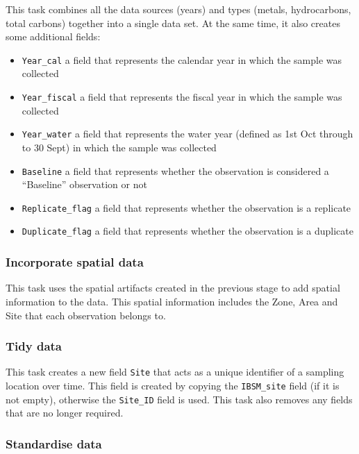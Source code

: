 \documentclass[
  8pt,
  a4paper]{article}
\providecommand{\tightlist}{%
  \setlength{\itemsep}{0pt}\setlength{\parskip}{0pt}}\usepackage{longtable,booktabs,array}
\begin{document}
This task combines all the data sources (years) and types (metals,
hydrocarbons, total carbons) together into a single data set. At the
same time, it also creates some additional fields:

\begin{itemize}
\tightlist
\item
  \texttt{Year\_cal} a field that represents the calendar year in which
  the sample was collected
\item
  \texttt{Year\_fiscal} a field that represents the fiscal year in which
  the sample was collected
\item
  \texttt{Year\_water} a field that represents the water year (defined
  as 1st Oct through to 30 Sept) in which the sample was collected
\item
  \texttt{Baseline} a field that represents whether the observation is
  considered a ``Baseline'' observation or not
\item
  \texttt{Replicate\_flag} a field that represents whether the
  observation is a replicate
\item
  \texttt{Duplicate\_flag} a field that represents whether the
  observation is a duplicate
\end{itemize}

\subsubsection{Incorporate spatial data}\label{incorporate-spatial-data}

This task uses the spatial artifacts created in the previous stage to
add spatial information to the data. This spatial information includes
the Zone, Area and Site that each observation belongs to.

\subsubsection{Tidy data}\label{tidy-data}

This task creates a new field \texttt{Site} that acts as a unique
identifier of a sampling location over time. This field is created by
copying the \texttt{IBSM\_site} field (if it is not empty), otherwise
the \texttt{Site\_ID} field is used. This task also removes any fields
that are no longer required.

\subsubsection{Standardise data}\label{standardise-data}
\end{document}
